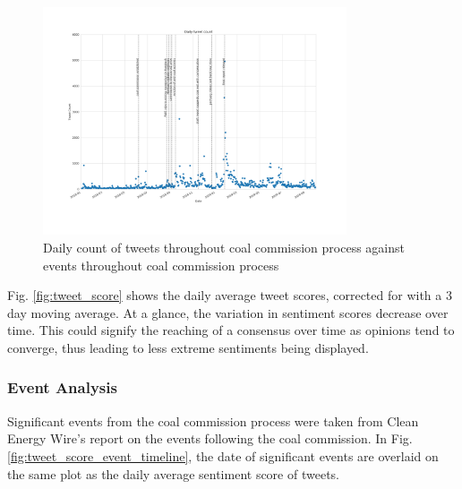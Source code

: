 \documentclass[10pt,twocolumn,twoside]{layout}
\begin{document}
{\begin{figure}[tp]
	\begin{center}
		\includegraphics[width=0.8\textwidth]{figures/tweet_count_event_timeline}
	\end{center}
	\caption{Daily count of tweets throughout coal commission process against events throughout coal commission process}
	\label{fig:tweet_count_event_timeline}
\end{figure}

Fig. \ref{fig:tweet_score} shows the daily average tweet scores, corrected for with a 3 day moving average. At a glance, the variation in sentiment scores decrease over time. This could signify the reaching of a consensus over time as opinions tend to converge, thus leading to less extreme sentiments being displayed. 

\subsubsection*{Event Analysis} 
Significant events from the coal commission process were taken from Clean Energy Wire's report on the events following the coal commission. \cite{Amelang2019} In Fig. \ref{fig:tweet_score_event_timeline}, the date of significant events are overlaid on the same plot as the daily average sentiment score of tweets. 
 
}
\end{document}
